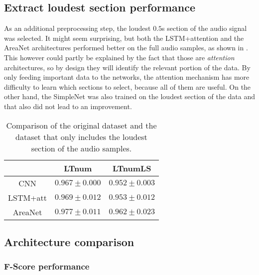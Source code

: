 
\subsection{Extract loudest section performance}

As an additional preprocessing step, the loudest $0.5$s section of the audio
signal was selected.
%
It might seem surprising, but both the LSTM+attention and the AreaNet
architectures performed better on the full audio samples, 
as shown in .
%
This however could partly be explained by the fact that those are \textit{attention}
architectures, so by design they will identify the relevant portion of the data.
By only feeding important data to the networks, the attention mechanism has more
difficulty to learn which sections to select, because all of them are useful.
%
On the other hand, the SimpleNet was also trained on the loudest section of the data
and that also did not lead to an improvement.

\begin{table}[t!]
    \centering
    \caption{Comparison of the original dataset and the dataset that only
    includes the loudest section of the audio samples.}
    \label{tab:comparison_loud_section}
    \begin{tabular}{|c|c|c|}
        \hline
        & LTnum & LTnumLS \\
        \hline
        CNN      & $0.967 \pm 0.000$ & $0.952 \pm 0.003$ \\
        LSTM+att & $0.969 \pm 0.012$ & $0.953 \pm 0.012$ \\
        AreaNet  & $0.977 \pm 0.011$ & $0.962 \pm 0.023$ \\
        \hline
    \end{tabular}
\end{table}

\subsection{Architecture comparison}

\subsubsection{F-Score performance}

